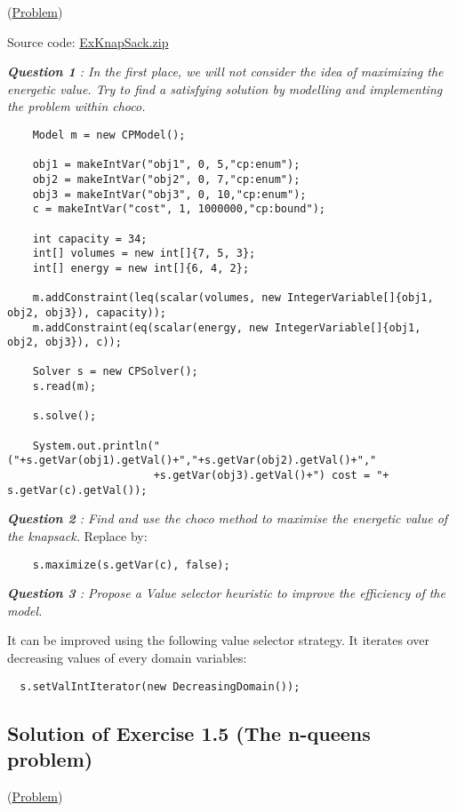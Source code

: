 (\hyperlink{exercises:exercise1.4}{Problem})

Source code: \href{media/zip/exknapsack.zip}{ExKnapSack.zip}

\noindent\emph{\textbf{Question 1} : In the first place, we will not consider the idea of maximizing the energetic value. Try to find a satisfying solution by modelling and implementing the problem within choco.}

\begin{lstlisting}
	Model m = new CPModel();
	
	obj1 = makeIntVar("obj1", 0, 5,"cp:enum");
	obj2 = makeIntVar("obj2", 0, 7,"cp:enum");
	obj3 = makeIntVar("obj3", 0, 10,"cp:enum");
	c = makeIntVar("cost", 1, 1000000,"cp:bound");
	
	int capacity = 34;
	int[] volumes = new int[]{7, 5, 3};
	int[] energy = new int[]{6, 4, 2};
	
	m.addConstraint(leq(scalar(volumes, new IntegerVariable[]{obj1, obj2, obj3}), capacity));
	m.addConstraint(eq(scalar(energy, new IntegerVariable[]{obj1, obj2, obj3}), c));
	
	Solver s = new CPSolver();
	s.read(m);

	s.solve();
	
	System.out.println("("+s.getVar(obj1).getVal()+","+s.getVar(obj2).getVal()+","
                       +s.getVar(obj3).getVal()+") cost = "+ s.getVar(c).getVal());
\end{lstlisting}

\noindent\emph{\textbf{Question 2} : Find and use the choco method to maximise the energetic value of the knapsack.}
Replace  by:
\begin{lstlisting}
	s.maximize(s.getVar(c), false);
\end{lstlisting}

\noindent\emph{\textbf{Question 3} : Propose a Value selector heuristic to improve the efficiency of the model.}

It can be improved using the following value selector strategy. It iterates over decreasing values of every domain variables: 
\begin{lstlisting}
  s.setValIntIterator(new DecreasingDomain());
\end{lstlisting}

\subsection{Solution of Exercise 1.5 (The n-queens problem)}\label{solutions:solutionofexercise1.5}\hypertarget{solutions:solutionofexercise1.5}{}
(\hyperlink{exercises:exercise1.5}{Problem})

